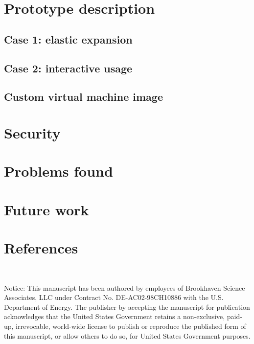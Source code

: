 \documentclass[a4paper]{jpconf}
\begin{document}
\section{Prototype description}

\subsection{Case 1: elastic expansion}

\subsection{Case 2: interactive usage}

\subsection{Custom virtual machine image}

\section{Security}

\section{Problems found}

\section{Future work}




\section*{References}{}




~

Notice:
This manuscript has been authored by employees of Brookhaven Science Associates,
LLC under Contract No. DE-AC02-98CH10886 with the U.S. Department of Energy.
The publisher by accepting the manuscript for publication acknowledges
that the United States Government retains a non-exclusive, paid-up, irrevocable,
world-wide license to publish or reproduce the published form of this manuscript,
or allow others to do so, for United States Government purposes.
\end{document}
